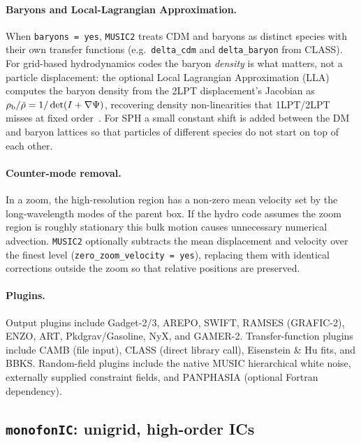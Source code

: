 \documentclass[12pt]{article}
\begin{document}
\paragraph{Baryons and Local-Lagrangian Approximation.}
When \texttt{baryons = yes}, \texttt{MUSIC2} treats CDM and baryons
as distinct species with their own transfer functions
(e.g.\ \texttt{delta\_cdm} and \texttt{delta\_baryon} from CLASS).
For grid-based hydrodynamics codes the baryon \emph{density} is what
matters, not a particle displacement: the optional Local Lagrangian
Approximation (LLA) computes the baryon density from the 2LPT
displacement's Jacobian as $\rho_{\rm b}/\bar\rho = 1/\det(I+\nabla\Psi)$,
recovering density non-linearities that 1LPT/2LPT misses at fixed
order~\citep{Bernardeau2002}.  For SPH a small constant shift is added
between the DM and baryon lattices so that particles of different
species do not start on top of each other.

\paragraph{Counter-mode removal.}  In a zoom, the high-resolution
region has a non-zero mean velocity set by the long-wavelength modes
of the parent box.  If the hydro code assumes the zoom region is
roughly stationary this bulk motion causes unnecessary numerical
advection.  \texttt{MUSIC2} optionally subtracts the mean displacement
and velocity over the finest level
(\texttt{zero\_zoom\_velocity = yes}), replacing them with identical
corrections outside the zoom so that relative positions are preserved.

\paragraph{Plugins.}  Output plugins include Gadget-2/3, AREPO, SWIFT,
RAMSES (GRAFIC-2), ENZO, ART, Pkdgrav/Gasoline, NyX, and GAMER-2.
Transfer-function plugins include CAMB (file input), CLASS (direct
library call), Eisenstein \& Hu fits, and BBKS.  Random-field plugins
include the native MUSIC hierarchical white noise, externally supplied
constraint fields, and PANPHASIA (optional Fortran dependency).

\subsection{\texttt{monofonIC}: unigrid, high-order ICs}
\label{sec:monofonic}
\end{document}

